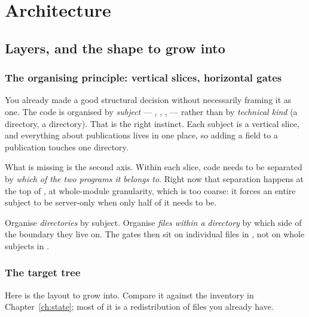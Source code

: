 \part{Architecture}

\chapter{Layers, and the shape to grow into}
\label{ch:layers}

\section{The organising principle: vertical slices, horizontal gates}

You already made a good structural decision without necessarily framing it as one. The code is
organised by \emph{subject} --- , ,
,  --- rather than by \emph{technical kind}
(a  directory, a  directory). That is the right instinct. Each
subject is a vertical slice, and everything about publications lives in one place, so adding a
field to a publication touches one directory.

What is missing is the second axis. Within each slice, code needs to be separated by \emph{which
of the two programs it belongs to}. Right now that separation happens at the top of
, at whole-module granularity, which is too coarse: it forces an entire subject to
be server-only when only half of it needs to be.

\begin{keyidea}
Organise \emph{directories} by subject. Organise \emph{files within a directory} by which side of
the boundary they live on. The  gates then sit on individual files in
, not on whole subjects in .
\end{keyidea}

\section{The target tree}

Here is the layout to grow into. Compare it against the inventory in Chapter~\ref{ch:state}; most
of it is a redistribution of files you already have.

